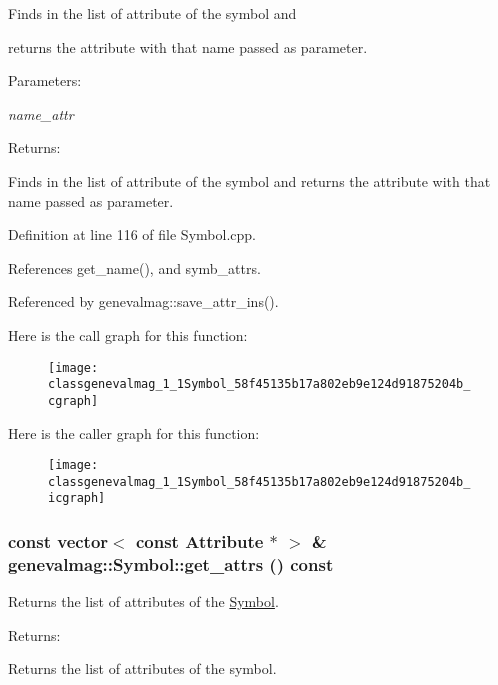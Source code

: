 Finds in the list of attribute of the symbol and\par
 returns the attribute with that name passed as parameter. \begin{Desc}
\item[Parameters:]
\begin{description}
\item[{\em name\_\-attr}]\end{description}
\end{Desc}
\begin{Desc}
\item[Returns:]\end{Desc}
Finds in the list of attribute of the symbol and returns the attribute with that name passed as parameter. 

Definition at line 116 of file Symbol.cpp.

References get\_\-name(), and symb\_\-attrs.

Referenced by genevalmag::save\_\-attr\_\-ins().

Here is the call graph for this function:\nopagebreak
\begin{figure}[H]
\begin{center}
\leavevmode
\texttt{[image: classgenevalmag\_1\_1Symbol\_58f45135b17a802eb9e124d91875204b\_cgraph]}
\end{center}
\end{figure}


Here is the caller graph for this function:\nopagebreak
\begin{figure}[H]
\begin{center}
\leavevmode
\texttt{[image: classgenevalmag\_1\_1Symbol\_58f45135b17a802eb9e124d91875204b\_icgraph]}
\end{center}
\end{figure}
\hypertarget{classgenevalmag_1_1Symbol_2691d14dc2083bb95c5c18017ad76c21}{
\subsubsection[{get\_\-attrs}]{\setlength{\rightskip}{0pt plus 5cm}const vector$<$ const {\bf Attribute} $\ast$ $>$ \& genevalmag::Symbol::get\_\-attrs () const}}
\label{classgenevalmag_1_1Symbol_2691d14dc2083bb95c5c18017ad76c21}


Returns the list of attributes of the \hyperlink{classgenevalmag_1_1Symbol}{Symbol}. \begin{Desc}
\item[Returns:]\end{Desc}
Returns the list of attributes of the symbol. 

